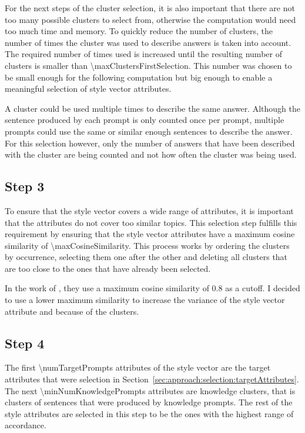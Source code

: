 For the next steps of the cluster selection, it is also important that there are not too many possible clusters to select from, otherwise the computation would need too much time and memory. To quickly reduce the number of clusters, the number of times the cluster was used to describe answers is taken into account. The required number of times used is increased until the resulting number of clusters is smaller than \num{\maxClustersFirstSelection}. This number was chosen to be small enough for the following computation but big enough to enable a meaningful selection of style vector attributes.

A cluster could be used multiple times to describe the same answer. Although the sentence produced by each prompt is only counted once per prompt, multiple prompts could use the same or similar enough sentences to describe the answer. For this selection however, only the number of answers that have been described with the cluster are being counted and not how often the cluster was being used.

\subsection{Step 3}
To ensure that the style vector covers a wide range of attributes, it is important that the attributes do not cover too similar topics. This selection step fulfills this requirement by ensuring that the style vector attributes have a maximum cosine similarity of \num{\maxCosineSimilarity}. This process works by ordering the clusters by occurrence, selecting them one after the other and deleting all clusters that are too close to the ones that have already been selected.

In the work of \citeauthor{patelLearningInterpretableStyle2023}, they use a maximum cosine similarity of \num{0.8} as a cutoff. I decided to use a lower maximum similarity to increase the variance of the style vector attribute and because of the clusters. %

\subsection{Step 4}
The first \num{\numTargetPrompts} attributes of the style vector are the target attributes that were selection in Section~\ref{sec:approach:selection:targetAttributes}. The next \num{\minNumKnowledgePrompts} attributes are knowledge clusters, that is clusters of sentences that were produced by knowledge prompts. The rest of the style attributes are selected in this step to be the ones with the highest range of accordance. %

